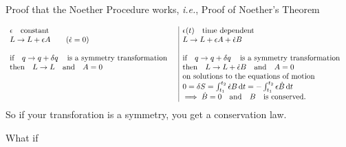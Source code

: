 \documentclass{article}
\begin{document}
Proof that the Noether Procedure works, \emph{i.e.}, Proof of Noether's Theorem


\[
    \begin{array}{l|l}
        \epsilon \qq{constant}                                 & \epsilon(t)\qq{time dependent}                                                         \\
        L\to L+\epsilon A \qquad(\dot{\epsilon}=0)             & L\to L+\epsilon A+\dot{\epsilon}B                                                      \\
                                                               &                                                                                        \\
        \qif* q\to q+\var{q} \qq{is a symmetry transformation} & \qif* q\to q+\var{q} \qq{is a symmetry transformation}                                 \\
        \qthen* L\to L \qand A=0                               & \qthen* L\to L+\dot{\epsilon}B \qand A=0                                               \\
                                                               & \qq*{on solutions to the equations of motion}                                          \\
                                                               & 0=\var{S}=\int_{t_1}^{t_2}\dot{\epsilon}B\dd{t}=-\int_{t_1}^{t_2}\epsilon\dot{B}\dd{t} \\
                                                               & \implies  \dot{B}=0\qand B \qq{is conserved.}                                          \\
    \end{array}
\]
So if your transforation is a symmetry, you get a conservation law.

What if
\end{document}
